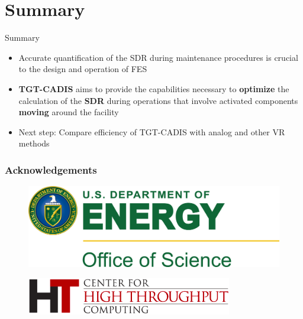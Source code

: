 \documentclass{beamer}
\begin{document}
\section{Summary}
\begin{frame}{Summary}
	\begin{itemize}
		\item{Accurate quantification of the SDR during maintenance
			procedures is crucial to the design and operation of
			FES}
\vspace{0.5cm}
		\item{\textbf{TGT-CADIS} aims to provide the capabilities necessary to
			\textbf{optimize} the calculation of the \textbf{SDR}
			during operations that involve activated components
			\textbf{moving} around the facility}
\vspace{0.5cm}
                 \item{Next step: Compare efficiency of TGT-CADIS with analog and other VR methods}
	\end{itemize}
\end{frame}

\begin{frame}
\frametitle{Acknowledgements}
\begin{figure}
        \includegraphics[width=.75\textwidth]{doe.jpg}
\end{figure}
\begin{figure}
        \includegraphics[width=0.8\textwidth]{CHTC-logo.png}
\end{figure}
\end{frame}

\end{document}
